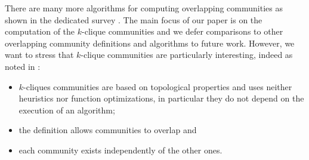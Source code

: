 There are many more algorithms for computing overlapping communities as shown in the dedicated survey \cite{xie2013overlapping}. The main focus of our paper is on the computation of the $k$-clique communities and we defer comparisons to other overlapping community definitions and algorithms to future work. However, we want to stress that $k$-clique communities are particularly interesting, indeed as noted in \cite{gregori2013parallel}:
\begin{itemize}
\item $k$-cliques communities are based on topological properties and uses neither heuristics nor function optimizations, in particular they do not depend on the execution of an algorithm;
\item the definition allows communities to overlap and
\item each community exists independently of the other ones.
\end{itemize}

